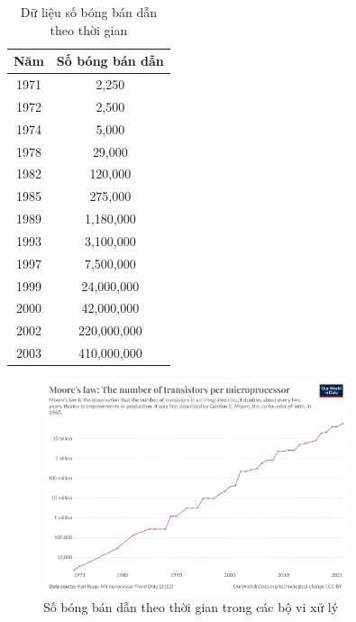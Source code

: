 \documentclass[final,letterpaper,twoside,12pt]{report}
\begin{document}
\begin{itemize}
	      \begin{table}[H]
		      \centering
		      \begin{tabular}{|c|c|}
			      \hline
			      \textbf{Năm} & \textbf{Số bóng bán dẫn} \\
			      \hline
			      1971         & 2,250                    \\
			      1972         & 2,500                    \\
			      1974         & 5,000                    \\
			      1978         & 29,000                   \\
			      1982         & 120,000                  \\
			      1985         & 275,000                  \\
			      1989         & 1,180,000                \\
			      1993         & 3,100,000                \\
			      1997         & 7,500,000                \\
			      1999         & 24,000,000               \\
			      2000         & 42,000,000               \\
			      2002         & 220,000,000              \\
			      2003         & 410,000,000              \\
			      \hline
		      \end{tabular}
		      \caption{Dữ liệu số bóng bán dẫn theo thời gian}
		      \label{tab:transistor_table}
	      \end{table}

	      \begin{figure}[H]
		      \centering
		      \includegraphics[width=0.8\textwidth]{transistors-per-microprocessor.png}
		      \caption{Số bóng bán dẫn theo thời gian trong các bộ vi xử lý}
	      \end{figure}


\end{itemize}
\end{document}
